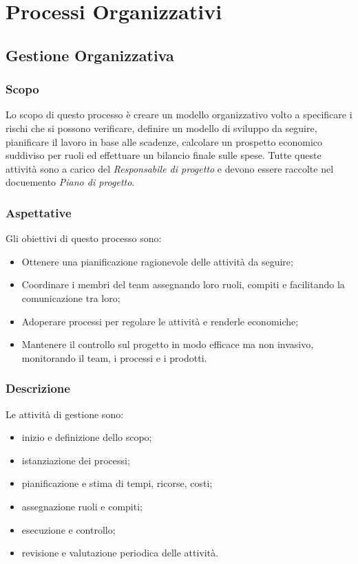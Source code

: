 \section{Processi Organizzativi}
	\subsection{Gestione Organizzativa}
		\subsubsection{Scopo}
		Lo scopo di questo processo è creare un modello organizzativo volto a specificare i rischi che si possono verificare, definire un modello di sviluppo da seguire, pianificare il lavoro in base alle scadenze, calcolare un prospetto economico suddiviso per ruoli ed effettuare un bilancio finale sulle spese. Tutte queste attività sono a carico del \textit{Responsabile di progetto} e devono essere raccolte nel docuemento \textit{Piano di progetto}.
		\subsubsection{Aspettative}
		Gli obiettivi di questo processo sono:
		\begin{itemize}
			\item Ottenere una pianificazione ragionevole delle attività da seguire;
			\item Coordinare i membri del team assegnando loro ruoli, compiti e facilitando la comunicazione tra loro;
			\item Adoperare processi per regolare le attività e renderle economiche;
			\item Mantenere il controllo sul progetto in modo efficace ma non invasivo, monitorando il team, i processi e i prodotti.
		\end{itemize}
		\subsubsection{Descrizione}
		Le attività di gestione sono:
		\begin{itemize}
			\item inizio e definizione dello scopo;
			\item istanziazione dei processi;
			\item pianificazione e stima di tempi, ricorse, costi;
			\item assegnazione ruoli e compiti;
			\item esecuzione e controllo;
			\item revisione e valutazione periodica delle attività.
		\end{itemize}

